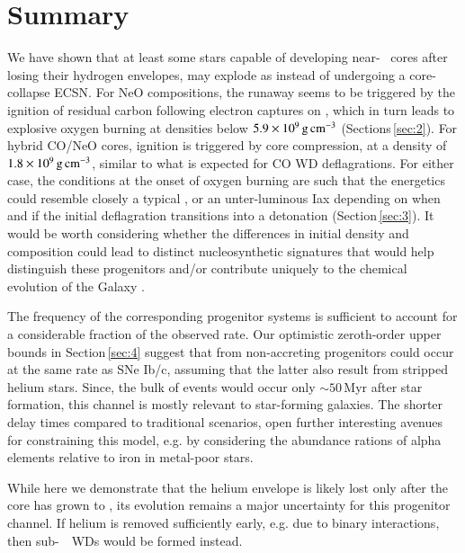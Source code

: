\documentclass[twocolumn]{aa}
\begin{document}
\section{Summary}\label{sec:5}
We have shown that at least some stars capable of developing near-\mch~ \one cores 
after losing their hydrogen  envelopes, may explode as \ias instead of 
undergoing a core-collapse  ECSN. For NeO compositions, the runaway seems to be triggered by the ignition of 
residual carbon following electron captures on , which in turn 
leads to explosive oxygen burning at densities below $5.9\times 10^{9}\mathrm{\,g\,cm^{-3}}$ (Sections\,\ref{sec:2}). 
For hybrid CO/NeO cores, ignition is triggered by core compression, at a density of $1.8\times10^{9}\mathrm{\,g\,cm^{-3}}$, similar to what is expected for CO WD deflagrations. For either case, the conditions at the onset of oxygen burning are such that the energetics  could resemble closely a typical \ia, or an unter-luminous Iax depending on when and if the initial deflagration transitions into a detonation (Section\,\ref{sec:3}). 
It would be worth considering whether the differences in initial density and 
composition could lead to distinct nucleosynthetic signatures that would help 
distinguish these progenitors and/or contribute uniquely to the chemical 
evolution of the Galaxy \citep[in analogy to ][for ECSNe]{Jones:2018ule}.



The frequency of the corresponding progenitor systems 
is sufficient to account for a considerable fraction of the observed \ia  rate.  Our optimistic zeroth-order upper bounds in  Section\,\ref{sec:4} suggest that \ias from non-accreting progenitors could occur at the same rate as SNe Ib/c, assuming that the latter also result from stripped helium stars. Since, the bulk of events would occur only $\sim 50$\,Myr after star formation, this channel is mostly relevant to star-forming galaxies. The shorter delay times compared to traditional \ia scenarios, open further interesting avenues for constraining this model, e.g.  by considering the abundance rations of alpha elements relative to iron in metal-poor stars. 

 While here we demonstrate that the helium envelope is  likely lost only  after the core has grown to \mch, its evolution remains a major uncertainty for this progenitor channel. If helium is removed sufficiently early, e.g. due to binary interactions, then sub-\mch~\one\ WDs would be formed instead. 
 
\end{document}
